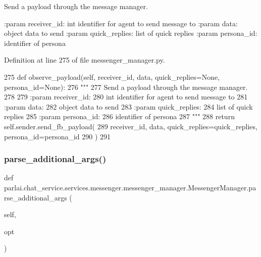 \begin{DoxyVerb}Send a payload through the message manager.

:param receiver_id:
    int identifier for agent to send message to
:param data:
    object data to send
:param quick_replies:
    list of quick replies
:param persona_id:
    identifier of persona
\end{DoxyVerb}
 

Definition at line 275 of file messenger\+\_\+manager.\+py.


\begin{DoxyCode}
275     \textcolor{keyword}{def }observe\_payload(self, receiver\_id, data, quick\_replies=None, persona\_id=None):
276         \textcolor{stringliteral}{"""}
277 \textcolor{stringliteral}{        Send a payload through the message manager.}
278 \textcolor{stringliteral}{}
279 \textcolor{stringliteral}{        :param receiver\_id:}
280 \textcolor{stringliteral}{            int identifier for agent to send message to}
281 \textcolor{stringliteral}{        :param data:}
282 \textcolor{stringliteral}{            object data to send}
283 \textcolor{stringliteral}{        :param quick\_replies:}
284 \textcolor{stringliteral}{            list of quick replies}
285 \textcolor{stringliteral}{        :param persona\_id:}
286 \textcolor{stringliteral}{            identifier of persona}
287 \textcolor{stringliteral}{        """}
288         \textcolor{keywordflow}{return} self.sender.send\_fb\_payload(
289             receiver\_id, data, quick\_replies=quick\_replies, persona\_id=persona\_id
290         )
291 
\end{DoxyCode}
\mbox{\label{classparlai_1_1chat__service_1_1services_1_1messenger_1_1messenger__manager_1_1MessengerManager_ab5419adfecea8ac7f1d5ceda1f15fad9}} 
\subsubsection{\texorpdfstring{parse\+\_\+additional\+\_\+args()}{parse\_additional\_args()}}
{\footnotesize\ttfamily def parlai.\+chat\+\_\+service.\+services.\+messenger.\+messenger\+\_\+manager.\+Messenger\+Manager.\+parse\+\_\+additional\+\_\+args (\begin{DoxyParamCaption}\item[{}]{self,  }\item[{}]{opt }\end{DoxyParamCaption})}




